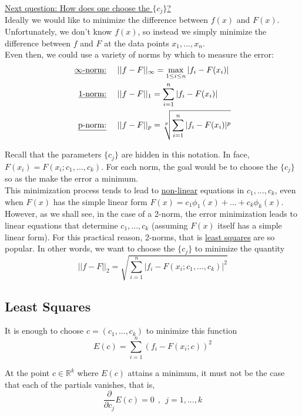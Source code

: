 {\underline{Next question: How does one choose the $\{c_j\}$?} \\

Ideally we would like to minimize the difference between $f(x)$ and $F(x)$. Unfortunately, we don't know $f(x)$, so instead we simply minimize the difference between $f$ and $F$ at the data points $x_1, ... , x_n$. \\

Even then, we could use a variety of norms by which to measure the error:
\begin{align*}
    \text{\underline{$\infty$-norm:}}~~&~~||f - F||_\infty = \max_{1 \leq i \leq n}{|f_i - F(x_i)|} \\
    \text{\underline{1-norm:}}~~&~~||f - F||_1 = \sum_{i = 1}^{n}{|f_i - F(x_i)|} \\
    \text{\underline{p-norm:}}~~&~~||f - F||_p = \sqrt[p]{\sum_{i = 1}^{n}{|f_i - F(x_i)|^p}}
\end{align*}

Recall that the parameters $\{c_j\}$ are hidden in this notation. In face, $F(x_i) = F(x_i; c_1, ... , c_k)$. For each norm, the goal would be to choose the $\{c_j\}$ so as the make the error a minimum. \\

This minimization process tends to lead to \underline{non-linear} equations in $c_1, ... , c_k$, even when $F(x)$ has the simple linear form $F(x) = c_1 \phi_1(x) + ... + c_k \phi_k(x)$. However, as we shall see, in the case of a 2-norm, the error minimization leads to linear equations that determine $c_1, ... , c_k$ (assuming $F(x)$ itself has a simple linear form). For this practical reason, 2-norms, that is \underline{least squares} are so popular. In other words, we want to choose the $\{c_j\}$ to minimize the quantity
\begin{equation*}
    ||f - F||_2 = \sqrt{\sum_{i = 1}^{n}{|f_i - F(x_i; c_1, ... , c_k)|^2}}
\end{equation*}

\subsection{Least Squares}
It is enough to choose $c = (c_1, ... , c_k)$ to minimize this function
\begin{equation*}
    E(c) = \sum_{i=1}^{n} (f_i - F(x_i; c))^2
\end{equation*}

At the point $c \in \mathbb{R}^k$ where $E(c)$ attains a minimum, it must not be the case that each of the partials vanishes, that is, 
\begin{equation*}
    \frac{\partial}{\partial c_j} E(c) = 0~~,~~j = 1, ... , k
\end{equation*}

}
